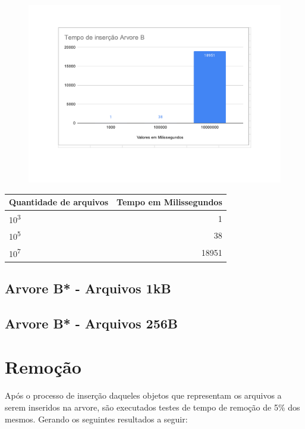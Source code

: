 \begin{figure}[ht]
    \centering
    \includegraphics[scale=0.6]{Trabalho AED/fig/Planilha sem título - Página4 (1).pdf}
    \label{fig:my_label}
\end{figure}
\begin{center}
        \begin{tabular}{| l | r |}
            \hline
            Quantidade de arquivos & Tempo em Milissegundos\\
            \hline
            10\textsuperscript{3} & 1\\
            10\textsuperscript{5} & 38\\
            10\textsuperscript{7} &  18951\\
            \hline
        \end{tabular}
    \end{center}


\subsection{Arvore B* - Arquivos 1kB}

\subsection{Arvore B* - Arquivos 256B}


\section{Remoção}

Após o processo de inserção daqueles objetos que representam os arquivos a serem inseridos na arvore, são executados testes de tempo de remoção de 5\% dos mesmos. Gerando os seguintes resultados a seguir:

